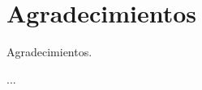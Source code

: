 

\begingroup
\let\clearpage\relax
\let\cleardoublepage\relax
\let\cleardoublepage\relax
\chapter*{Agradecimientos}
Agradecimientos.

\bigskip

...


\endgroup
